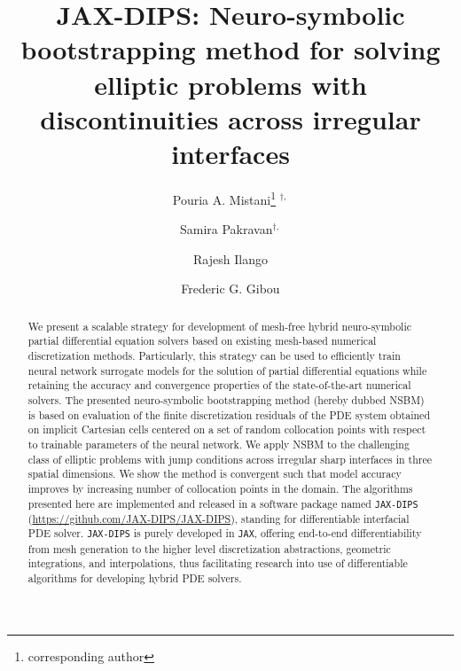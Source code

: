 \documentclass{elsarticle}
\begin{document}

\title{JAX-DIPS: Neuro-symbolic bootstrapping method for solving elliptic problems with discontinuities across irregular interfaces}



\author[1]{Pouria A. Mistani\thanks{corresponding author} $^{\dagger,}$}
\author[2]{Samira Pakravan$^{\dagger,}$}
\author[1]{Rajesh Ilango}
\author[2]{Frederic G. Gibou}

\address[1]{NVIDIA Corporation, Santa Clara, CA 95051, USA}
\address[2]{University of California, Santa Barbara, CA 93106-5070, USA}

\begin{abstract}
	We present a scalable strategy for development of mesh-free hybrid neuro-symbolic partial differential equation solvers based on existing mesh-based numerical discretization methods. Particularly, this strategy can be used to efficiently train neural network surrogate models for the solution of partial differential equations while retaining the accuracy and convergence properties of the state-of-the-art numerical solvers. The presented neuro-symbolic bootstrapping method (hereby dubbed NSBM) is based on evaluation of the finite discretization residuals of the PDE system obtained on implicit Cartesian cells centered on a set of random collocation points with respect to trainable parameters of the neural network. We apply NSBM to the challenging class of elliptic problems with jump conditions across irregular sharp interfaces in three spatial dimensions. We show the method is convergent such that model accuracy improves by increasing number of collocation points in the domain.  The algorithms presented here are implemented and released in a software package named \texttt{JAX-DIPS} (\href{https://github.com/JAX-DIPS/JAX-DIPS}{https://github.com/JAX-DIPS/JAX-DIPS}), standing for differentiable interfacial PDE solver. \texttt{JAX-DIPS} is purely developed in \texttt{JAX}, offering end-to-end differentiability from mesh generation to the higher level discretization abstractions, geometric integrations, and interpolations, thus facilitating research into use of differentiable algorithms for developing hybrid PDE solvers.

\end{abstract}
\end{document}
